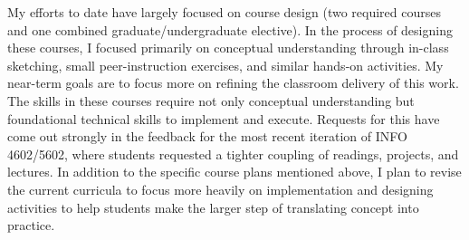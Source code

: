 \documentclass[11pt]{article}
\begin{document}
My efforts to date have largely focused on course design (two required courses and one combined graduate/undergraduate elective). In the process of designing these courses, I focused primarily on conceptual understanding through in-class sketching, small peer-instruction exercises, and similar hands-on activities. My near-term goals are to focus more on refining the classroom delivery of this work. The skills in these courses require not only conceptual understanding but foundational technical skills to implement and execute. Requests for this have come out strongly in the feedback for the most recent iteration of INFO 4602/5602, where students requested a tighter coupling of readings, projects, and lectures. In addition to the specific course plans mentioned above, I plan to revise the current curricula to focus more heavily on implementation and designing activities to help students make the larger step of translating concept into practice. 


\pagebreak
\setcounter{page}{1}
\end{document}
